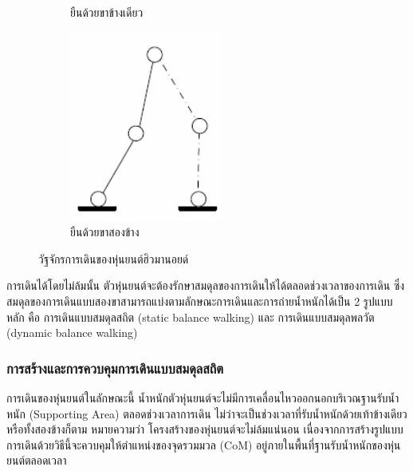 \begin{figure}[htbp]
\begin{subfigure}[b]{0.45\textwidth}
		\caption{ยืนด้วยขาข้างเดียว}
		\label{fig:robot_walk_2}
	\end{subfigure}
	\hfill
	\begin{subfigure}[b]{0.22\textwidth}
		\centering
		\includegraphics[width=\textwidth]{chapter2/images/doublesupport2.png}
		\caption{ยืนด้วยขาสองข้าง}
		\label{fig:robot_walk_3}
	\end{subfigure}
	\caption{วัฐจักรการเดินของหุ่นยนต์ฮิวมานอยด์}
	\label{fig:robot_walk_phase}
\end{figure}

การเดินได้โดยไม่ล้มนั้น ตัวหุ่นยนต์จะต้องรักษาสมดุลของการเดินให้ได้ตลอดช่วงเวลาของการเดิน
ซึ่งสมดุลของการเดินแบบสองขาสามารถแบ่งตามลักษณะการเดินและการถ่ายน้ำหนักได้เป็น 2 รูปแบบหลัก คือ 
การเดินแบบสมดุลสถิต (static balance walking) และ การเดินแบบสมดุลพลวัต (dynamic balance walking)

\subsubsection{การสร้างและการควบคุมการเดินแบบสมดุลสถิต}
การเดินของหุ่นยนต์ในลักษณะนี้ น้ำหนักตัวหุ่นยนต์จะไม่มีการเคลื่อนไหวออกนอกบริเวณฐานรับน้ำหนัก (Supporting Area)
ตลอดช่วงเวลาการเดิน ไม่ว่าจะเป็นช่วงเวลาที่รับน้ำหนักด้วยเท้าข้างเดียวหรือทั้งสองข้างก็ตาม หมายความว่า โครงสร้างของหุ่นยนต์จะไม่ล้มแน่นอน
เนื่องจากการสร้างรูปแบบการเดินด้วยวิธีนี้จะควบคุมให้ตำแหน่งของจุดรวมมวล (CoM) อยู่ภายในพื้นที่ฐานรับน้ำหนักของหุ่นยนต์ตลอดเวลา

